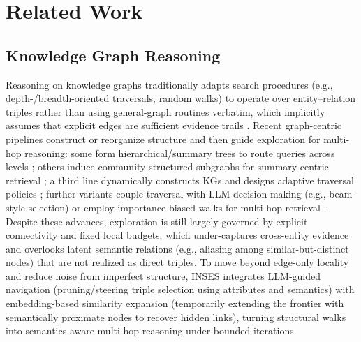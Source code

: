 \documentclass{article}
\theoremstyle{plain}
\theoremstyle{definition}
\theoremstyle{remark}
\begin{document}
\section{Related Work}
\subsection{Knowledge Graph Reasoning}
Reasoning on knowledge graphs traditionally adapts search procedures (e.g., depth-/breadth-oriented traversals, random walks) to operate over entity–relation triples rather than using general-graph routines verbatim, which implicitly assumes that explicit edges are sufficient evidence trails \citep{wang2013programming, yih2015semantic, sun2018open, lao2010relational, ristoski2016rdf2vec}. Recent graph-centric pipelines construct or reorganize structure and then guide exploration for multi-hop reasoning: some form hierarchical/summary trees to route queries across levels \citep{sarthi2024raptor, zhangsirerag}; others induce community-structured subgraphs for summary-centric retrieval \citep{edge2024local}; a third line dynamically constructs KGs and designs adaptive traversal policies \citep{li2024dalk, wang2024knowledge}; further variants couple traversal with LLM decision-making (e.g., beam-style selection) \citep{thinkongraph2024, thinkongraph2025} or employ importance-biased walks for multi-hop retrieval \citep{gutierrez2024hipporag}. Despite these advances, exploration is still largely governed by explicit connectivity and fixed local budgets, which under-captures cross-entity evidence and overlooks latent semantic relations (e.g., aliasing among similar-but-distinct nodes) that are not realized as direct triples. To move beyond edge-only locality and reduce noise from imperfect structure, INSES integrates LLM-guided navigation (pruning/steering triple selection using attributes and semantics) with embedding-based similarity expansion (temporarily extending the frontier with semantically proximate nodes to recover hidden links), turning structural walks into semantics-aware multi-hop reasoning under bounded iterations.
\end{document}
